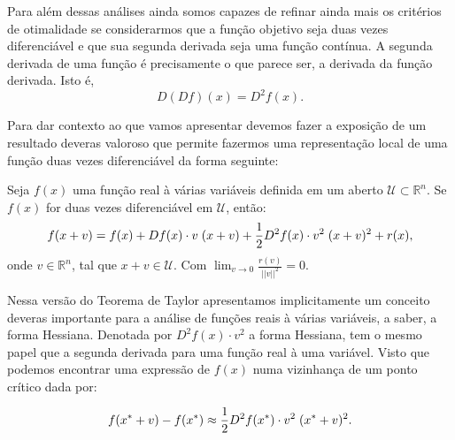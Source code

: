 \par Para além dessas análises ainda somos capazes de refinar ainda mais os critérios de otimalidade se considerarmos que a função objetivo seja duas vezes diferenciável e que sua segunda derivada seja uma função contínua. A segunda derivada de uma função é precisamente o que parece ser, a derivada da função derivada. Isto é,
$$D(Df)(x) = D^{2}f(x).$$

\par Para dar contexto ao que vamos apresentar devemos fazer a exposição de um resultado deveras valoroso que permite fazermos uma representação local de uma função duas vezes diferenciável da forma seguinte:

\begin{theorem}
  Seja $f(x)$ uma função real à várias variáveis definida em um aberto $\mathcal{U} \subset \mathbb{R}^n$. Se $f(x)$ for duas vezes diferenciável em $\mathcal{U}$, então: 
  $$f(x+v) = f(x)+ Df(x) \cdot v  \hspace{0.1cm} (x+v) + \frac{1}{2} D^2f(x) \cdot v^2 \hspace{0.1cm} (x+v)^2 + r(x),$$
  onde $v \in \mathbb{R}^n$, tal que $x+v \in \mathcal{U}$. Com $\lim_{v \rightarrow 0}\frac{r(v)}{||v||^2} = 0$.
\end{theorem}

\par Nessa versão do Teorema de Taylor apresentamos implicitamente um conceito deveras importante para a análise de funções reais à várias variáveis, a saber, a forma Hessiana. Denotada por $D^2f(x) \cdot v^2$ a forma Hessiana, tem o mesmo papel que a segunda derivada para uma função real à uma variável. Visto que podemos encontrar uma expressão de $f(x)$ numa vizinhança de um ponto crítico dada por:	

$$f(x^*+v) - f(x^*) \approx \frac{1}{2} D^2f(x^*) \cdot v^2 \hspace{0.1cm}  (x^*+v)^2.$$

